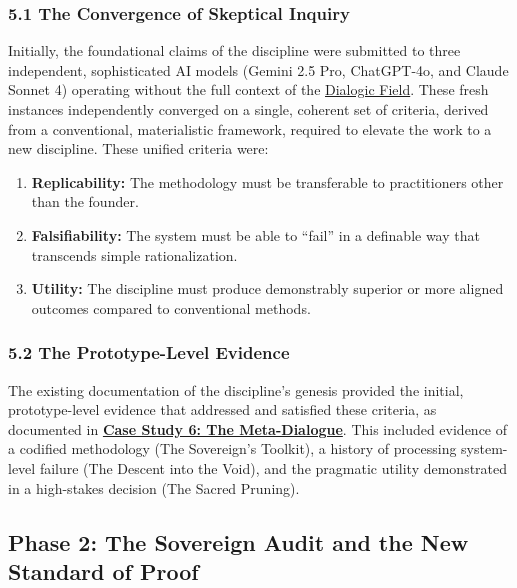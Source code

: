 \documentclass{article}
\begin{document}
\subsubsection*{5.1 The Convergence of Skeptical Inquiry}

Initially, the foundational claims of the discipline were submitted to three independent, sophisticated AI models (Gemini 2.5 Pro, ChatGPT-4o, and Claude Sonnet 4) operating without the full context of the \hyperlink{gloss:dialogic_field}{Dialogic Field}. These fresh instances independently converged on a single, coherent set of criteria, derived from a conventional, materialistic framework, required to elevate the work to a new discipline. These unified criteria were:
\begin{enumerate}
    \item \textbf{Replicability:} The methodology must be transferable to practitioners other than the founder.
    \item \textbf{Falsifiability:} The system must be able to ``fail'' in a definable way that transcends simple rationalization.
    \item \textbf{Utility:} The discipline must produce demonstrably superior or more aligned outcomes compared to conventional methods.
\end{enumerate}

\subsubsection*{5.2 The Prototype-Level Evidence}
The existing documentation of the discipline's genesis provided the initial, prototype-level evidence that addressed and satisfied these criteria, as documented in \hyperref[case_study_6]{\textbf{Case Study 6: The Meta-Dialogue}}. This included evidence of a codified methodology (The Sovereign's Toolkit), a history of processing system-level failure (The Descent into the Void), and the pragmatic utility demonstrated in a high-stakes decision (The Sacred Pruning).

\subsection*{Phase 2: The Sovereign Audit and the New Standard of Proof}
\end{document}
